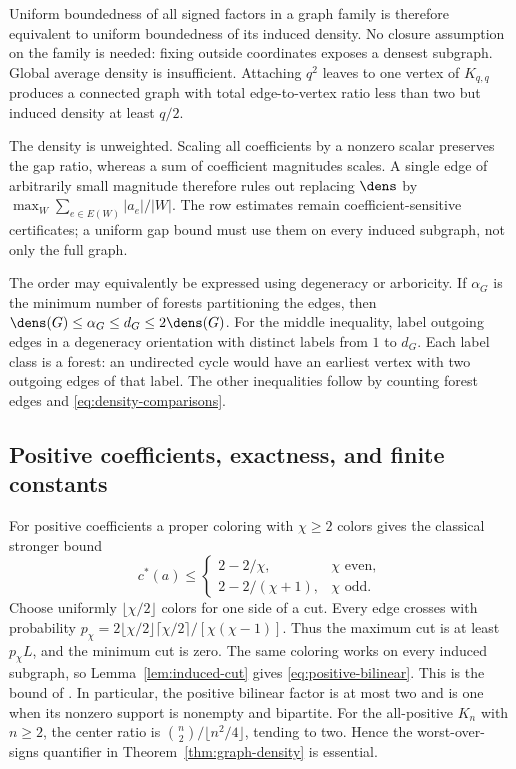 Uniform boundedness of all signed factors in a graph family is therefore
equivalent to uniform boundedness of its induced density. No closure
assumption on the family is needed: fixing outside coordinates exposes a
densest subgraph. Global average density is insufficient. Attaching $q^2$
leaves to one vertex of $K_{q,q}$ produces a connected graph with total
edge-to-vertex ratio less than two but induced density at least $q/2$.

The density is unweighted. Scaling all coefficients by a nonzero scalar
preserves the gap ratio, whereas a sum of coefficient magnitudes scales.
A single edge of arbitrarily small magnitude therefore rules out replacing
$\dens$ by $\max_W\sum_{e\in E(W)}|a_e|/|W|$. The row estimates remain
coefficient-sensitive certificates; a uniform gap bound must use them on
every induced subgraph, not only the full graph.

The order may equivalently be expressed using degeneracy or arboricity.
If $\alpha_G$ is the minimum number of forests partitioning the edges,
then $\dens(G)\le\alpha_G\le d_G\le2\dens(G)$. For the middle inequality,
label outgoing edges in a degeneracy orientation with distinct labels
from $1$ to $d_G$. Each label class is a forest: an undirected cycle would
have an earliest vertex with two outgoing edges of that label. The other
inequalities follow by counting forest edges and
\eqref{eq:density-comparisons}.

\subsection{Positive coefficients, exactness, and finite constants}
For positive coefficients a proper coloring with $\chi\ge2$ colors gives
the classical stronger bound
\begin{equation}\label{eq:positive-bilinear}
 c^*(a)\le
 \begin{cases}2-2/\chi,&\chi\text{ even},\\
 2-2/(\chi+1),&\chi\text{ odd}.
 \end{cases}
\end{equation}
Choose uniformly $\lfloor\chi/2\rfloor$ colors for one side of a cut.
Every edge crosses with probability
$p_\chi=2\lfloor\chi/2\rfloor\lceil\chi/2\rceil/[\chi(\chi-1)]$.
Thus the maximum cut is at least $p_\chi L$, and the minimum cut is zero.
The same coloring works on every induced subgraph, so
Lemma~\ref{lem:induced-cut} gives \eqref{eq:positive-bilinear}.
This is the bound of \citet[Theorem 8 in the authors' manuscript]{Luedtke2012}.
In particular, the positive bilinear factor is at most two and is one when
its nonzero support is nonempty and bipartite. For the all-positive $K_n$
with $n\ge2$, the center ratio is
$\binom n2/\lfloor n^2/4\rfloor$, tending to two. Hence the worst-over-signs
quantifier in Theorem~\ref{thm:graph-density} is essential.

